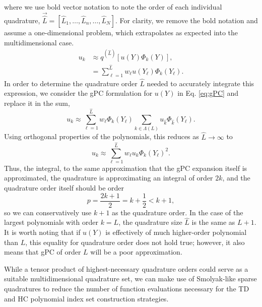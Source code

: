 where we use bold vector notation to note the order of each individual quadrature,
$\vec{\hat L} = [\hat L_1, \ldots,\hat L_n,\ldots,\hat L_N]$. For clarity, we remove the bold notation and
assume a one-dimensional problem, which extrapolates as expected into the multidimensional case.
\begin{align}
  u_k &\approx q^{(\hat L)}[u(Y)\Phi_k(Y)],\\
      &= \sum_{\ell=1}^{\hat L} w_\ell u(Y_\ell)\Phi_k(Y_\ell).
\end{align}
In order to determine the quadrature order $\hat L$ needed to accurately integrate this expression, we consider the
gPC formulation for $u(Y)$ in Eq. \ref{eq:gPC} and replace it in the sum,
\begin{equation}
  u_k\approx \sum_{\ell=1}^{\hat L} w_\ell \Phi_k(Y_\ell) \sum_{k\in\Lambda(L)}u_{\hat k}\Phi_{\hat k}(Y_\ell).
\end{equation}
Using orthogonal properties of the polynomials, this reduces as $\hat L\to\infty$ to
\begin{equation}
  u_k\approx \sum_{\ell=1}^{\hat L} w_\ell u_k \Phi_k(Y_\ell)^2.
\end{equation}
Thus, the integral, to the same approximation that the gPC expansion itself is approximated, the quadrature is
approximating an integral of order $2k$, and the quadrature order itself should be order 
\begin{equation}
  p=\frac{2k+1}{2}=k+\frac{1}{2}<k+1,
\end{equation}
so we can conservatively use $k+1$ as the quadrature order.  In the case of the largest polynomials with order
$k=L$, the quadrature size $\hat L$ is the same as $L+1$.  It is worth noting that if $u(Y)$ is effectively of
much higher-order polynomial than $L$, this equality for quadrature order does not hold true; however, it also
means that gPC of order $L$ will be a poor approximation.

While a tensor product of highest-necessary quadrature orders could serve as a suitable multidimensional
quadrature set, we can make use of Smolyak-like sparse quadratures to reduce the number of function
evaluations necessary for the TD and HC polynomial index set construction strategies.

